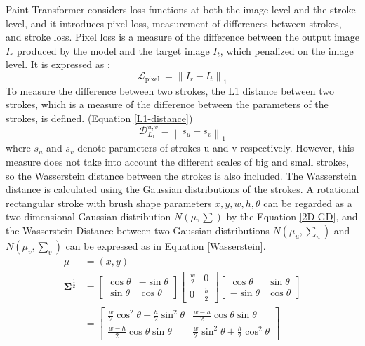 Paint Transformer considers loss functions at both the image level and the 
stroke level, and it introduces pixel loss, measurement of differences between
strokes, and stroke loss.
Pixel loss is a measure of the difference between the output image $I_r$ produced 
by the model and the target image $I_t$, which penalized on the image level.
It is expressed as :
\begin{equation}
    \mathcal{L}_{\text {pixel }}=\left\|I_r-I_t\right\|_1
\end{equation}
To measure the difference between two strokes, the L1 distance between two 
strokes, which is a measure of the difference between the parameters of the 
strokes, is defined. (Equation \eqref{L1-distance})
\begin{equation}
    \label{L1-distance}
    \mathcal{D}_{L_1}^{u, v}=\left\|s_u-s_v\right\|_1
\end{equation}
where $s_u$ and $s_v$ denote parameters of strokes u and v respectively. 
However, this measure does not take into account the different scales of 
big and small strokes, so the Wasserstein distance between the strokes is also 
included. The Wasserstein distance is calculated using the Gaussian distributions
of the strokes. 
A rotational rectangular stroke with brush shape parameters ${x, y, w, h, \theta}$
can be regarded as a two-dimensional Gaussian distribution $N(\mu, \sum)$ by the 
Equation \eqref{2D-GD}, and the Wasserstein Distance between two Gaussian 
distributions $N(\mu_u, \sum_u)$ and $N(\mu_v, \sum_v)$ can be expressed as in 
Equation \eqref{Wasserstein}.
\begin{equation}
    \label{2D-GD}
    \begin{aligned} \mu & =(x, y) \\ \boldsymbol{\Sigma}^{\frac{1}{2}} & =\left[\begin{array}{cc}\cos \theta & -\sin \theta \\ \sin \theta & \cos \theta\end{array}\right]\left[\begin{array}{cc}\frac{w}{2} & 0 \\ 0 & \frac{h}{2}\end{array}\right]\left[\begin{array}{cc}\cos \theta & \sin \theta \\ -\sin \theta & \cos \theta\end{array}\right] \\ & =\left[\begin{array}{cc}\frac{w}{2} \cos ^2 \theta+\frac{h}{2} \sin ^2 \theta & \frac{w-h}{2} \cos \theta \sin \theta \\ \frac{w-h}{2} \cos \theta \sin \theta & \frac{w}{2} \sin ^2 \theta+\frac{h}{2} \cos ^2 \theta\end{array}\right]\end{aligned}
\end{equation}
